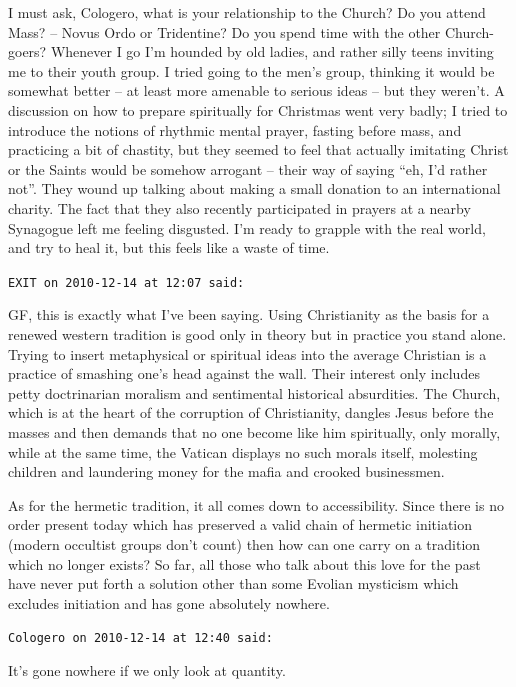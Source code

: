 \begin{footnotesize}
\begin{sffamily}
I must ask, Cologero, what is your relationship to the Church? Do you attend Mass? -- Novus Ordo or Tridentine? Do you spend time with the other Church-goers? Whenever I go I'm hounded by old ladies, and rather silly teens inviting me to their youth group. I tried going to the men's group, thinking it would be somewhat better -- at least more amenable to serious ideas -- but they weren't. A discussion on how to prepare spiritually for Christmas went very badly; I tried to introduce the notions of rhythmic mental prayer, fasting before mass, and practicing a bit of chastity, but they seemed to feel that actually imitating Christ or the Saints would be somehow arrogant -- their way of saying ``eh, I'd rather not''. They wound up talking about making a small donation to an international charity. The fact that they also recently participated in prayers at a nearby Synagogue left me feeling disgusted. I'm ready to grapple with the real world, and try to heal it, but this feels like a waste of time.

\hfill

\texttt{EXIT on 2010-12-14 at 12:07 said:}

GF, this is exactly what I've been saying. Using Christianity as the basis for a renewed western tradition is good only in theory but in practice you stand alone. Trying to insert metaphysical or spiritual ideas into the average Christian is a practice of smashing one's head against the wall. Their interest only includes petty doctrinarian moralism and sentimental historical absurdities. The Church, which is at the heart of the corruption of Christianity, dangles Jesus before the masses and then demands that no one become like him spiritually, only morally, while at the same time, the Vatican displays no such morals itself, molesting children and laundering money for the mafia and crooked businessmen.

As for the hermetic tradition, it all comes down to accessibility. Since there is no order present today which has preserved a valid chain of hermetic initiation (modern occultist groups don't count) then how can one carry on a tradition which no longer exists? So far, all those who talk about this love for the past have never put forth a solution other than some Evolian mysticism which excludes initiation and has gone absolutely nowhere.

\hfill

\texttt{Cologero on 2010-12-14 at 12:40 said:}

It's gone nowhere if we only look at quantity.


\end{sffamily}
\end{footnotesize}
